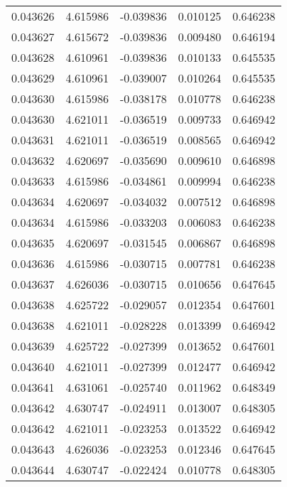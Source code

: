 \begin{tabular}{lrrrr}
0.043626    &  4.615986 & -0.039836 &  0.010125 &             0.646238 \\
0.043627    &  4.615672 & -0.039836 &  0.009480 &             0.646194 \\
0.043628    &  4.610961 & -0.039836 &  0.010133 &             0.645535 \\
0.043629    &  4.610961 & -0.039007 &  0.010264 &             0.645535 \\
0.043630    &  4.615986 & -0.038178 &  0.010778 &             0.646238 \\
0.043630    &  4.621011 & -0.036519 &  0.009733 &             0.646942 \\
0.043631    &  4.621011 & -0.036519 &  0.008565 &             0.646942 \\
0.043632    &  4.620697 & -0.035690 &  0.009610 &             0.646898 \\
0.043633    &  4.615986 & -0.034861 &  0.009994 &             0.646238 \\
0.043634    &  4.620697 & -0.034032 &  0.007512 &             0.646898 \\
0.043634    &  4.615986 & -0.033203 &  0.006083 &             0.646238 \\
0.043635    &  4.620697 & -0.031545 &  0.006867 &             0.646898 \\
0.043636    &  4.615986 & -0.030715 &  0.007781 &             0.646238 \\
0.043637    &  4.626036 & -0.030715 &  0.010656 &             0.647645 \\
0.043638    &  4.625722 & -0.029057 &  0.012354 &             0.647601 \\
0.043638    &  4.621011 & -0.028228 &  0.013399 &             0.646942 \\
0.043639    &  4.625722 & -0.027399 &  0.013652 &             0.647601 \\
0.043640    &  4.621011 & -0.027399 &  0.012477 &             0.646942 \\
0.043641    &  4.631061 & -0.025740 &  0.011962 &             0.648349 \\
0.043642    &  4.630747 & -0.024911 &  0.013007 &             0.648305 \\
0.043642    &  4.621011 & -0.023253 &  0.013522 &             0.646942 \\
0.043643    &  4.626036 & -0.023253 &  0.012346 &             0.647645 \\
0.043644    &  4.630747 & -0.022424 &  0.010778 &             0.648305 \\

\end{tabular}

